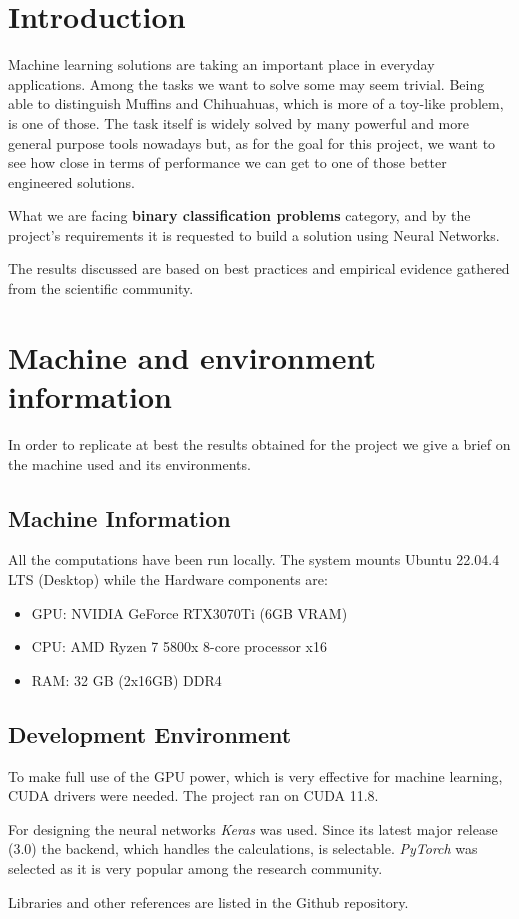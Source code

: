 \newpage


\section{Introduction}\label{sec:introduction}
Machine learning solutions are taking an important place in everyday applications.
Among the tasks we want to solve some may seem trivial.
Being able to distinguish Muffins and Chihuahuas, which is more of a toy-like problem, is one of those.
The task itself is widely solved by many powerful and more general purpose tools nowadays but,
as for the goal for this project, we want to see how close in terms of performance we can get to one of those better engineered solutions.

What we are facing \textbf{binary classification problems} category,
and by the project's requirements it is requested to build a solution using Neural Networks.

The results discussed are based on best practices and empirical evidence gathered from the scientific community.


\section{Machine and environment information}\label{sec:machine-and-environment-information}
In order to replicate at best the results obtained for the project we give a brief on the machine used
and its environments.

\subsection{Machine Information}\label{subsec:machine-information}

All the computations have been run locally.
The system mounts Ubuntu 22.04.4 LTS (Desktop) while the Hardware components are:

\begin{itemize}
    \item GPU: NVIDIA GeForce RTX3070Ti (6GB VRAM)
    \item CPU: AMD Ryzen 7 5800x 8-core processor x16
    \item RAM: 32 GB (2x16GB) DDR4
\end{itemize}

\subsection{Development Environment}\label{subsec:development-environment}
To make full use of the GPU power, which is very effective for machine learning, CUDA drivers were needed. The project ran on CUDA 11.8.

For designing the neural networks \textit{Keras} was used. Since its latest major release (3.0)
the backend, which handles the calculations, is selectable.
\textit{PyTorch} was selected as it is very popular among the research community.

Libraries and other references are listed in the Github repository\cite{todo}.